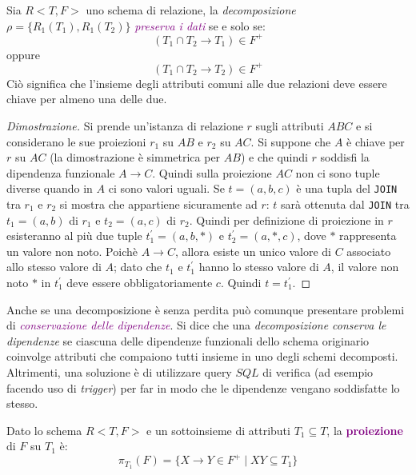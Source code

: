 \begin{theorem}
    Sia $R<T, F>$ uno schema di relazione, la \emph{decomposizione}
    $\rho = \{R_1(T_1), R_1(T_2)\}$ \emph{\textcolor{purple}{preserva i dati}}
    se e solo se:
    \begin{equation*}
        (T_1 \cap T_2 \rightarrow T_1) \in F^+
    \end{equation*}
    oppure
    \begin{equation*}
        (T_1 \cap T_2 \rightarrow T_2) \in F^+
    \end{equation*}
    Ciò significa che l'insieme degli attributi comuni alle due relazioni deve essere chiave
    per almeno una delle due.
\end{theorem}

\begin{proof}[Dimostrazione]
    Si prende un'istanza di relazione $r$ sugli attributi $ABC$ e si considerano
    le sue proiezioni $r_1$ su $AB$ e $r_2$ su $AC$.
    Si suppone che $A$ è chiave per $r$ su $AC$ (la dimostrazione è simmetrica per $AB$) e
    che quindi $r$ soddisfi la dipendenza funzionale $A \rightarrow C$. Quindi sulla
    proiezione $AC$ non ci sono tuple diverse quando in $A$ ci sono valori uguali.
    Se $t = (a,b,c)$ è una tupla del \verb|JOIN| tra $r_1$ e $r_2$ si mostra che appartiene
    sicuramente ad $r$: $t$ sarà ottenuta dal \verb|JOIN| tra $t_1 = (a,b)$ di $r_1$
    e $t_2 = (a,c)$ di $r_2$. Quindi per definizione di proiezione in $r$ esisteranno al più due tuple
    $t_{1}^{'} = (a,b,*)$ e $t_{2}^{'} = (a,*,c)$, dove $*$ rappresenta un valore non noto.
    Poichè $A \rightarrow C$, allora esiste un unico valore di $C$ associato allo stesso valore di $A$;
    dato che $t_1$ e $t_{1}^{'}$ hanno lo stesso valore di $A$, il valore non noto $*$ in $t_{1}^{'}$
    deve essere obbligatoriamente $c$. Quindi $t = t_{1}^{'}$.
\end{proof}

Anche se una decomposizione è senza perdita può comunque presentare problemi di \emph{\textcolor{purple}{conservazione delle dipendenze}}.
Si dice che una \emph{decomposizione conserva le dipendenze} se ciascuna delle dipendenze funzionali dello schema originario
coinvolge attributi che compaiono tutti insieme in uno degli schemi decomposti.
Altrimenti, una soluzione è di utilizzare query $SQL$ di verifica (ad esempio facendo uso di \emph{trigger}) per
far in modo che le dipendenze vengano soddisfatte lo stesso.

\begin{definition}[Proiezione]
    Dato lo schema $R<T,F>$ e un sottoinsieme di attributi $T_1 \subseteq T$,
    la \textbf{\textcolor{purple}{proiezione}} di $F$ su $T_1$ è:
    \begin{equation*}
        \pi_{T_1}(F) = \{X \rightarrow Y \in F^+ \;|\; XY \subseteq T_1\}
    \end{equation*}
\end{definition}

